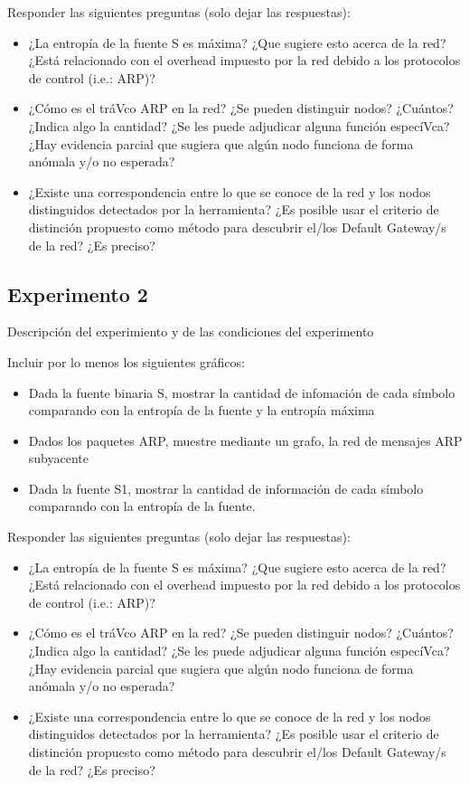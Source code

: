 Responder las siguientes preguntas (solo dejar las respuestas):

\begin{itemize}
	\item ¿La entropía de la fuente S es máxima? ¿Que sugiere esto acerca de la red? ¿Está relacionado con el overhead impuesto por la red debido a los protocolos de control (i.e.: ARP)?
	\item ¿Cómo es el tráVco ARP en la red? ¿Se pueden distinguir nodos? ¿Cuántos? ¿Indica algo la cantidad? ¿Se les puede adjudicar alguna función especíVca? ¿Hay evidencia parcial que sugiera que algún nodo funciona de forma anómala y/o no esperada?
	\item ¿Existe una correspondencia entre lo que se conoce de la red y los nodos distinguidos detectados por la herramienta? ¿Es posible usar el criterio de distinción propuesto como método para descubrir el/los Default Gateway/s de la red? ¿Es preciso?
\end{itemize}

\subsection{Experimento 2}

Descripci\'on del experimiento y de las condiciones del experimento

Incluir por lo menos los siguientes gr\'aficos:

\begin{itemize}
	\item Dada la fuente binaria S, mostrar la cantidad de infomación de cada símbolo comparando con la entropía de la fuente y la entropía máxima
	\item Dados los paquetes ARP, muestre mediante un grafo, la red de mensajes ARP subyacente
	\item Dada la fuente S1, mostrar la cantidad de información de cada símbolo comparando con la entropía de la fuente.
\end{itemize}

Responder las siguientes preguntas (solo dejar las respuestas):

\begin{itemize}
	\item ¿La entropía de la fuente S es máxima? ¿Que sugiere esto acerca de la red? ¿Está relacionado con el overhead impuesto por la red debido a los protocolos de control (i.e.: ARP)?
	\item ¿Cómo es el tráVco ARP en la red? ¿Se pueden distinguir nodos? ¿Cuántos? ¿Indica algo la cantidad? ¿Se les puede adjudicar alguna función especíVca? ¿Hay evidencia parcial que sugiera que algún nodo funciona de forma anómala y/o no esperada?
	\item ¿Existe una correspondencia entre lo que se conoce de la red y los nodos distinguidos detectados por la herramienta? ¿Es posible usar el criterio de distinción propuesto como método para descubrir el/los Default Gateway/s de la red? ¿Es preciso?
\end{itemize}


